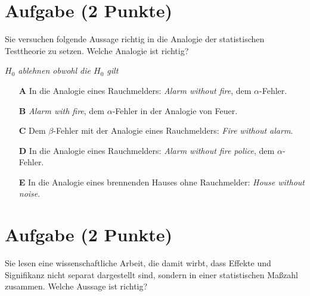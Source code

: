 \documentclass[a4paper, 9pt]{scrartcl}\usepackage[]{graphicx}\usepackage[]{xcolor}
\begin{document}

\section{Aufgabe \hfill (2 Punkte)}



Sie versuchen folgende Aussage richtig in die Analogie der statistischen Testtheorie zu setzen. Welche Analogie ist richtig?

\begin{center}
\textit{$H_0$ ablehnen obwohl die $H_0$ gilt}
\end{center}



\begin{enumerate}
\item [\textbf{A} \msquare] In die Analogie eines Rauchmelders: \textit{Alarm without fire}, dem $\alpha$-Fehler.
\item [\textbf{B} \msquare] \textit{Alarm with fire}, dem $\alpha$-Fehler in der Analogie von Feuer.
\item [\textbf{C} \msquare] Dem $\beta$-Fehler mit der Analogie eines Rauchmelders: \textit{Fire without alarm}.
\item [\textbf{D} \msquare] In die Analogie eines Rauchmelders: \textit{Alarm without fire police}, dem $\alpha$-Fehler.
\item [\textbf{E} \msquare] In die Analogie eines brennenden Hauses ohne Rauchmelder: \textit{House without noise}.
\end{enumerate}

\section{Aufgabe \hfill (2 Punkte)}



Sie lesen eine wissenschaftliche Arbeit, die damit wirbt, dass Effekte und Signifikanz nicht separat dargestellt sind, sondern in einer statistischen Maßzahl zusammen. Welche Aussage ist richtig?
\end{document}
